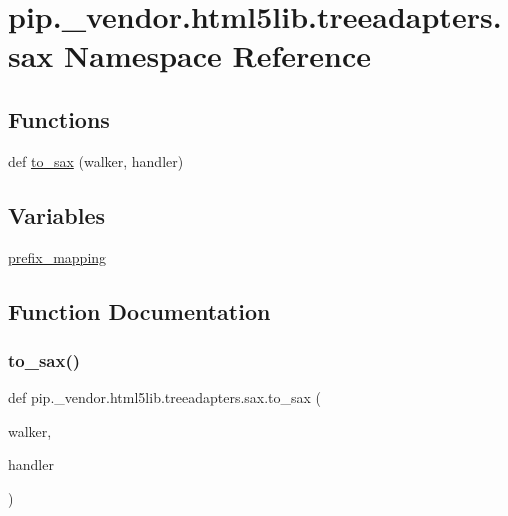 \hypertarget{namespacepip_1_1__vendor_1_1html5lib_1_1treeadapters_1_1sax}{}\section{pip.\+\_\+vendor.\+html5lib.\+treeadapters.\+sax Namespace Reference}
\label{namespacepip_1_1__vendor_1_1html5lib_1_1treeadapters_1_1sax}
\subsection*{Functions}
\begin{DoxyCompactItemize}
\item 
def \hyperlink{namespacepip_1_1__vendor_1_1html5lib_1_1treeadapters_1_1sax_a2202ce59c85c1deba2b40bfba87cac6e}{to\+\_\+sax} (walker, handler)
\end{DoxyCompactItemize}
\subsection*{Variables}
\begin{DoxyCompactItemize}
\item 
\hyperlink{namespacepip_1_1__vendor_1_1html5lib_1_1treeadapters_1_1sax_a77c831479ceaedd9bd8a30178640db48}{prefix\+\_\+mapping}
\end{DoxyCompactItemize}


\subsection{Function Documentation}
\mbox{\label{namespacepip_1_1__vendor_1_1html5lib_1_1treeadapters_1_1sax_a2202ce59c85c1deba2b40bfba87cac6e}} 
\subsubsection{\texorpdfstring{to\+\_\+sax()}{to\_sax()}}
{\footnotesize\ttfamily def pip.\+\_\+vendor.\+html5lib.\+treeadapters.\+sax.\+to\+\_\+sax (\begin{DoxyParamCaption}\item[{}]{walker,  }\item[{}]{handler }\end{DoxyParamCaption})}

